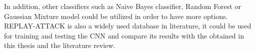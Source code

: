 In addition, other classifiers such as Naive Bayes classifier, Random Forest or Gaussian Mixture model could be utilized in order to have more options.\\

REPLAY-ATTACK is also a widely used database in literature, it could be used for training and testing the CNN and compare its results with the obtained in this thesis and the literature review.\\